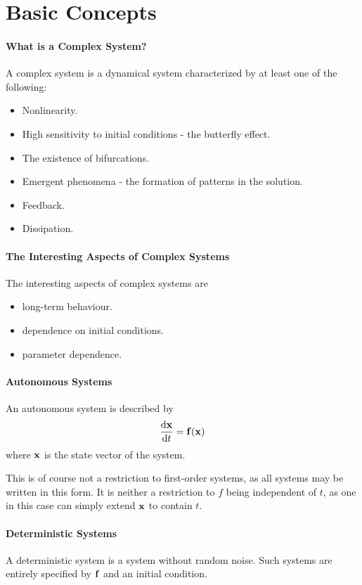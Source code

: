 \section{Basic Concepts}

\paragraph{What is a Complex System?}
A complex system is a dynamical system characterized by at least one of the following:
\begin{itemize}
	\item Nonlinearity.
	\item High sensitivity to initial conditions - the butterfly effect.
	\item The existence of bifurcations.
	\item Emergent phenomena - the formation of patterns in the solution.
	\item Feedback.
	\item Dissipation.
\end{itemize}

\paragraph{The Interesting Aspects of Complex Systems}
The interesting aspects of complex systems are
\begin{itemize}
	\item long-term behaviour.
	\item dependence on initial conditions.
	\item parameter dependence.
\end{itemize}

\paragraph{Autonomous Systems}
An autonomous system is described by
\begin{align*}
	\dv{\vb{x}}{t} = \vb{f}(\vb{x})
\end{align*}
where $\vb{x}$ is the state vector of the system.

This is of course not a restriction to first-order systems, as all systems may be written in this form. It is neither a restriction to $f$ being independent of $t$, as one in this case can simply extend $\vb{x}$ to contain $t$.

\paragraph{Deterministic Systems}
A deterministic system is a system without random noise. Such systems are entirely specified by $\vb{f}$ and an initial condition.

